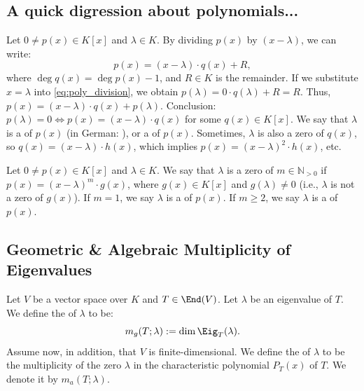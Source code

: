 \subsection{A quick digression about polynomials...}
Let $0 \ne p(x) \in K[x]$ and $\lambda \in K$. By dividing $p(x)$ by $(x-\lambda)$, we can write:
\begin{equation} \label{eq:poly_division}
  p(x) = (x-\lambda) \cdot q(x) + R,
\end{equation}
where $\deg q(x) = \deg p(x) - 1$, and $R \in K$ is the remainder.
If we substitute $x = \lambda$ into \eqref{eq:poly_division}, we obtain $p(\lambda) = 0 \cdot q(\lambda) + R = R$. Thus, $p(x) = (x-\lambda) \cdot q(x) + p(\lambda)$.
Conclusion: $p(\lambda) = 0 \iff p(x) = (x-\lambda) \cdot q(x)$ for some $q(x) \in K[x]$.
We say that $\lambda$ is a  of $p(x)$ (in German: ), or a  of $p(x)$.
Sometimes, $\lambda$ is also a zero of $q(x)$, so $q(x) = (x-\lambda) \cdot h(x)$, which implies $p(x) = (x-\lambda)^2 \cdot h(x)$, etc.

\begin{definition}
  \label{def:mult_zero}
  Let $0 \ne p(x) \in K[x]$ and $\lambda \in K$. We say that $\lambda$ is a zero of  $m \in \mathbb{N}_{>0}$ if $p(x) = (x-\lambda)^m \cdot g(x)$, where $g(x) \in K[x]$ and $g(\lambda) \ne 0$ (i.e., $\lambda$ is not a zero of $g(x)$).
  If $m=1$, we say $\lambda$ is a  of $p(x)$.
  If $m \ge 2$, we say $\lambda$ is a  of $p(x)$.
\end{definition}

\subsection{Geometric \& Algebraic Multiplicity of Eigenvalues}

\begin{definition}
  \label{def:geom_alg_mult}
  Let $V$ be a vector space over $K$ and $T \in \End(V)$. Let $\lambda$ be an eigenvalue of $T$. We define the  of $\lambda$ to be:
  \[ m_g(T;\lambda) := \dim \Eig_T(\lambda). \]
  Assume now, in addition, that $V$ is finite-di\-men\-sional. We define the  of $\lambda$ to be the multiplicity of the zero $\lambda$ in the characteristic polynomial $P_T(x)$ of $T$. We denote it by $m_a(T;\lambda)$.
\end{definition}

